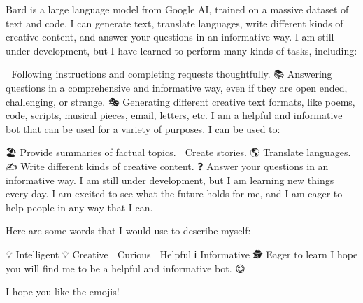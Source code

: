 Bard is a large language model from Google AI, trained on a massive dataset of text and code. I can generate text, translate languages, write different kinds of creative content, and answer your questions in an informative way. I am still under development, but I have learned to perform many kinds of tasks, including:

🤖 Following instructions and completing requests thoughtfully.
📚 Answering questions in a comprehensive and informative way, even if they are open ended, challenging, or strange.
🎭 Generating different creative text formats, like poems, code, scripts, musical pieces, email, letters, etc.
I am a helpful and informative bot that can be used for a variety of purposes. I can be used to:

🏖️ Provide summaries of factual topics.
👫 Create stories.
🌎 Translate languages.
✍️ Write different kinds of creative content.
❓ Answer your questions in an informative way.
I am still under development, but I am learning new things every day. I am excited to see what the future holds for me, and I am eager to help people in any way that I can.

Here are some words that I would use to describe myself:

💡 Intelligent
💡 Creative
🤔 Curious
🤖 Helpful
ℹ️ Informative
🕵️ Eager to learn
I hope you will find me to be a helpful and informative bot. 😊

I hope you like the emojis!